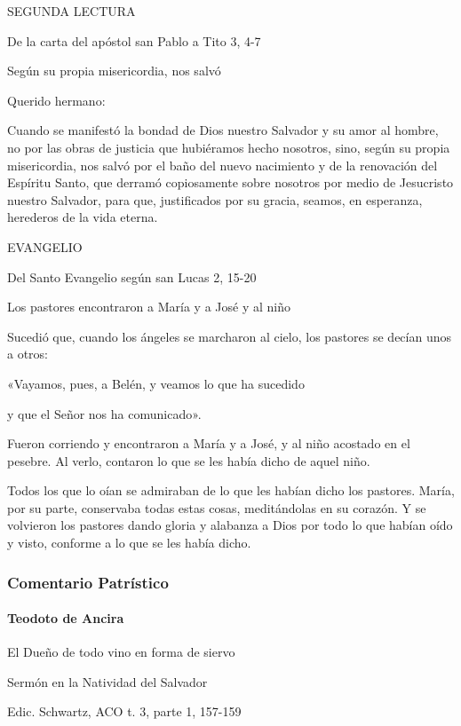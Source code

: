 \documentclass[]{article}
\let\oldparagraph\paragraph
\renewcommand{\paragraph}[1]{\oldparagraph{#1}\mbox{}}
\begin{document}
SEGUNDA LECTURA

De la carta del apóstol san Pablo a Tito 3, 4-7

Según su propia misericordia, nos salvó

Querido hermano:

Cuando se manifestó la bondad de Dios nuestro Salvador y su amor al
hombre, no por las obras de justicia que hubiéramos hecho nosotros,
sino, según su propia misericordia, nos salvó por el baño del nuevo
nacimiento y de la renovación del Espíritu Santo, que derramó
copiosamente sobre nosotros por medio de Jesucristo nuestro Salvador,
para que, justificados por su gracia, seamos, en esperanza, herederos de
la vida eterna.

EVANGELIO

Del Santo Evangelio según san Lucas 2, 15-20

Los pastores encontraron a María y a José y al niño

Sucedió que, cuando los ángeles se marcharon al cielo, los pastores se
decían unos a otros:

«Vayamos, pues, a Belén, y veamos lo que ha sucedido

y que el Señor nos ha comunicado».

Fueron corriendo y encontraron a María y a José, y al niño acostado en
el pesebre. Al verlo, contaron lo que se les había dicho de aquel niño.

Todos los que lo oían se admiraban de lo que les habían dicho los
pastores. María, por su parte, conservaba todas estas cosas,
meditándolas en su corazón. Y se volvieron los pastores dando gloria y
alabanza a Dios por todo lo que habían oído y visto, conforme a lo que
se les había dicho.

\protect\hypertarget{_Toc448662792}{}{}

\subsubsection{Comentario Patrístico}\label{comentario-patruxedstico-6}

\paragraph{Teodoto de Ancira}\label{teodoto-de-ancira}

El Dueño de todo vino en forma de siervo

Sermón en la Natividad del Salvador

Edic. Schwartz, ACO t. 3, parte 1, 157-159
\end{document}
